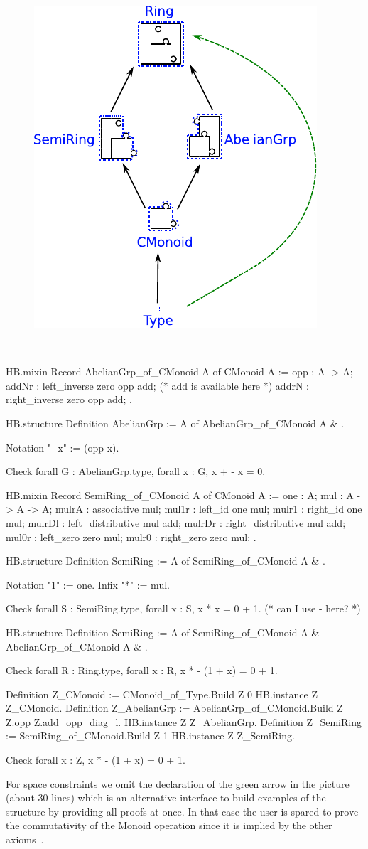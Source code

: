 \documentclass{easychair}
\begin{document}
\begin{figure}
  \includegraphics[width=.4\textwidth]{diagram.pdf}
\end{figure}
\
\begin{coqcode}
HB.mixin Record AbelianGrp_of_CMonoid A of CMonoid A := {
  opp   : A -> A;
  addNr : left_inverse zero opp add; (* add is available here *)
  addrN : right_inverse zero opp add;
}.

HB.structure Definition AbelianGrp :=
  { A of AbelianGrp_of_CMonoid A & }.

Notation "- x" := (opp x).

Check forall G : AbelianGrp.type, forall x : G, x + - x = 0.

HB.mixin Record SemiRing_of_CMonoid A of CMonoid A := {
  one    : A;
  mul    : A -> A -> A;
  mulrA  : associative mul;
  mul1r  : left_id one mul;
  mulr1  : right_id one mul;
  mulrDl : left_distributive mul add;
  mulrDr : right_distributive mul add;
  mul0r  : left_zero zero mul;
  mulr0  : right_zero zero mul;
}.

HB.structure Definition SemiRing := { A of SemiRing_of_CMonoid A & }.

Notation "1" := one.
Infix    "*" := mul.

Check forall S : SemiRing.type, forall x : S, x * x = 0 + 1. (* can I use - here? *)

HB.structure Definition SemiRing := { A of SemiRing_of_CMonoid A & AbelianGrp_of_CMonoid A & }.

Check forall R : Ring.type, forall x : R, x * - (1 + x) = 0 + 1.

Definition Z_CMonoid    := CMonoid_of_Type.Build Z 0%
HB.instance Z Z_CMonoid.
Definition Z_AbelianGrp := AbelianGrp_of_CMonoid.Build Z Z.opp Z.add_opp_diag_l.
HB.instance Z Z_AbelianGrp.
Definition Z_SemiRing   := SemiRing_of_CMonoid.Build Z 1%
HB.instance Z Z_SemiRing.

Check forall x : Z, x * - (1 + x) = 0 + 1.
\end{coqcode}

For space constraints we omit the declaration of the green arrow
in the picture (about 30 lines) which is an alternative interface
to build examples of the \coq{Ring} structure by providing all
proofs at once. In that case the user is spared to prove the commutativity
of the Monoid operation since it is implied by the other axioms~\cite{nearrings}.


\end{document}
